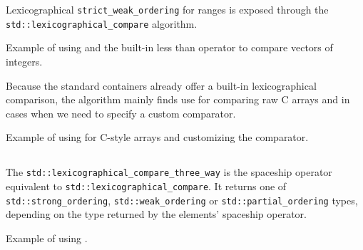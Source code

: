 Lexicographical \texttt{strict\_weak\_ordering} for ranges is exposed through the \texttt{std::lexicographical\_compare} algorithm.



\begin{box-note}
\footnotesize Example of using  and the built-in less than operator to compare vectors of integers.
\tcblower
{}
\end{box-note}

Because the standard containers already offer a built-in lexicographical comparison, the algorithm mainly finds use for comparing raw C arrays and in cases when we need to specify a custom comparator.

\begin{box-note}
\footnotesize Example of using  for C-style arrays and customizing the comparator.
\tcblower
{}
\end{box-note}

\subsection{\texorpdfstring{}{\texttt{std::lexicographical\_compare\_three\_way}}}

The \texttt{std::lexicographical\_compare\_three\_way} is the spaceship operator equivalent to \texttt{std::lexicographical\_compare}. It returns one of \texttt{std::strong\_ordering}, \texttt{std::weak\_ordering} or \texttt{std::partial\_ordering} types, depending on the type returned by the elements' spaceship operator.



\begin{box-note}
\footnotesize Example of using .
\tcblower
{}
\end{box-note}

